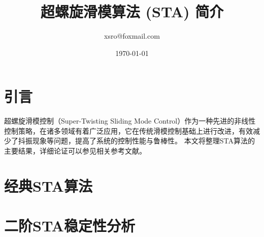 \documentclass[UTF8]{ctexart}
\title{超螺旋滑模算法 (STA) 简介}
\author{xsro@foxmail.com}
\date{\today}
\begin{document}
	

	\maketitle
	
	\section{引言}
	超螺旋滑模控制（Super-Twisting Sliding Mode Control）作为一种先进的非线性控制策略，在诸多领域有着广泛应用，它在传统滑模控制基础上进行改进，有效减少了抖振现象等问题，提高了系统的控制性能与鲁棒性。
	本文将整理STA算法的主要结果，详细论证可以参见相关参考文献。
	
	\section{经典STA算法}
	
	
	\section{二阶STA稳定性分析}
	
	
	
	\printbibliography %
\end{document}
